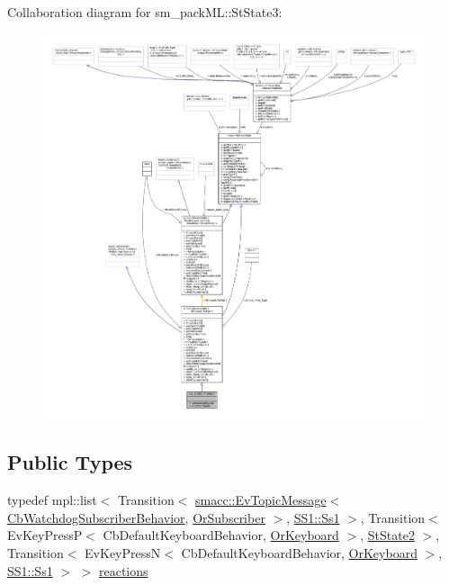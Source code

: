 Collaboration diagram for sm\+\_\+pack\+ML\+:\+:St\+State3\+:
\nopagebreak
\begin{figure}[H]
\begin{center}
\leavevmode
\includegraphics[width=350pt]{structsm__packML_1_1StState3__coll__graph}
\end{center}
\end{figure}
\subsection*{Public Types}
\begin{DoxyCompactItemize}
\item 
typedef mpl\+::list$<$ Transition$<$ \hyperlink{structsmacc_1_1default__events_1_1EvTopicMessage}{smacc\+::\+Ev\+Topic\+Message}$<$ \hyperlink{classsm__packML_1_1cl__subscriber_1_1CbWatchdogSubscriberBehavior}{Cb\+Watchdog\+Subscriber\+Behavior}, \hyperlink{classsm__packML_1_1OrSubscriber}{Or\+Subscriber} $>$, \hyperlink{structsm__packML_1_1SS1_1_1Ss1}{S\+S1\+::\+Ss1} $>$, Transition$<$ Ev\+Key\+PressP$<$ Cb\+Default\+Keyboard\+Behavior, \hyperlink{classsm__packML_1_1OrKeyboard}{Or\+Keyboard} $>$, \hyperlink{structsm__packML_1_1StState2}{St\+State2} $>$, Transition$<$ Ev\+Key\+PressN$<$ Cb\+Default\+Keyboard\+Behavior, \hyperlink{classsm__packML_1_1OrKeyboard}{Or\+Keyboard} $>$, \hyperlink{structsm__packML_1_1SS1_1_1Ss1}{S\+S1\+::\+Ss1} $>$ $>$ \hyperlink{structsm__packML_1_1StState3_af4c5429b333954877ff64c5db6558912}{reactions}
\end{DoxyCompactItemize}
